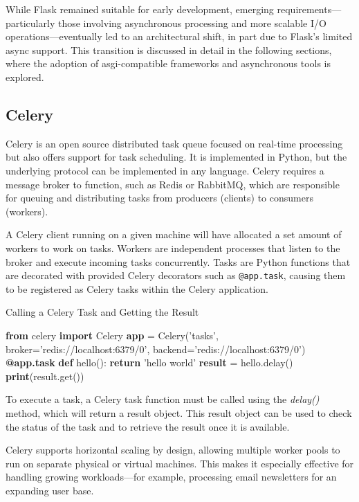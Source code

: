 While Flask remained suitable for early development, emerging requirements—particularly those involving asynchronous 
processing and more scalable I/O operations—eventually led to an architectural shift, in part due to Flask's limited async 
support. This transition is discussed in detail in the following sections, where the adoption of \ac{asgi}-compatible 
frameworks and asynchronous tools is explored.

\subsection{Celery}
Celery is an open source distributed task queue focused on real-time processing but also offers support for task scheduling.
It is implemented in Python, but the underlying protocol can be implemented in any language. Celery requires a message broker 
to function, such as Redis or RabbitMQ, which are responsible for queuing and distributing tasks from producers (clients) to 
consumers (workers).

A Celery client running on a given machine will have allocated a set amount of workers to work on tasks. Workers are 
independent processes that listen to the broker and execute incoming tasks concurrently. Tasks are Python functions that 
are decorated with provided Celery decorators such as \texttt{@app.task}, causing them to be registered as Celery tasks 
within the Celery application.

\begin{algorithm}
  \caption{Calling a Celery Task and Getting the Result}\label{celery-call-result}
  \begin{algorithmic}[1]
    \State \textbf{from} celery \textbf{import} Celery
    \State
    \State \textbf{app} = Celery('tasks', broker='redis://localhost:6379/0', backend='redis://localhost:6379/0')
    \State
    \State \textbf{@app.task}
    \State \textbf{def} hello():
    \State \hspace{1em} \textbf{return} 'hello world'
    \State
    \State \textbf{result} = hello.delay()
    \State \textbf{print}(result.get())
  \end{algorithmic}
\end{algorithm}

To execute a task, a Celery task function must be called using the \textit{delay()} method, which will return a result object. 
This result object can be used to check the status of the task and to retrieve the result once it is available.

Celery supports horizontal scaling by design, allowing multiple worker pools to run on separate physical or virtual machines. 
This makes it especially effective for handling growing workloads—for example, processing email newsletters for an expanding 
user base.

